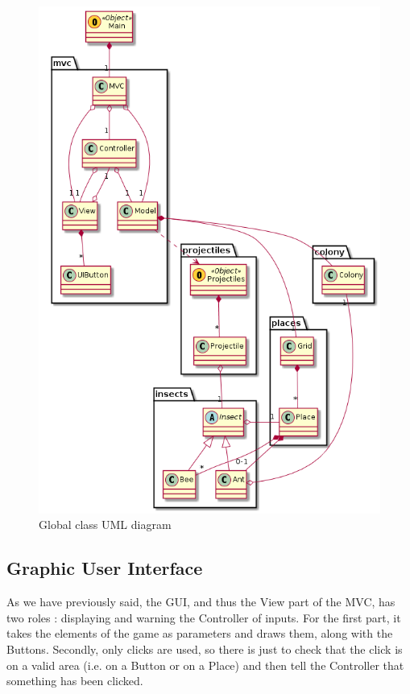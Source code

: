 \documentclass[
	a4paper
]{article}
\begin{document}
%
\begin{figure}[H]
	\includegraphics[scale=0.65]{classDiagram.png}
	\caption{Global class UML diagram}
	\label{classDiagram}
\end{figure}
%

	\subsection{Graphic User Interface}
	
	As we have previously said, the GUI, and thus the View part of the MVC, has two roles : %
displaying and warning the Controller of inputs. For the first part, it takes the elements of the game as parameters and draws them, along with the Buttons. %
Secondly, only clicks are used, so there is just to check that the click is on a valid area (i.e. on a Button or on a Place) and then tell the Controller that something has been clicked.
	
\end{document}
